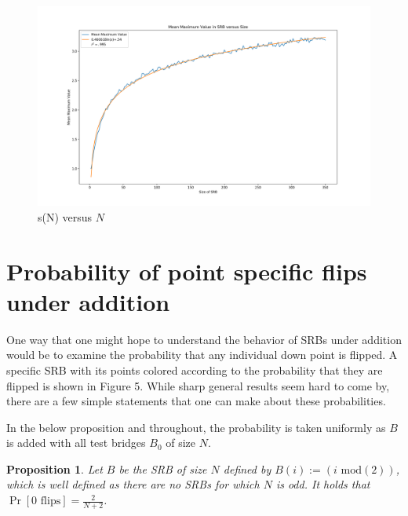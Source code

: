 \documentclass{article}
\newtheorem{proposition}{Proposition}
\theoremstyle{definition}
\begin{document}
\begin{figure}[h!]
\caption{s(N) versus $N$}
\centering
\includegraphics[width=\textwidth]{Figure_4}
\end{figure}


\section{Probability of point specific flips under addition}

One way that one might hope to understand the behavior of SRBs under addition would be to examine the probability that any individual down point is flipped. A specific SRB with its points colored according to the probability that they are flipped is shown in Figure 5. While sharp general results seem hard to come by, there are a few simple statements that one can make about these probabilities.

In the below proposition and throughout, the probability is taken uniformly as $B$ is added with all test bridges $B_0$ of size $N$.

\begin{proposition} Let $B$ be the SRB of size $N$ defined by $B(i):=(i\,\,\mathrm{mod}(2))$, which is well defined as there are no SRBs for which $N$ is odd. It holds that $\Pr[0\,\,\mathrm{flips}]=\frac{2}{N+2}$.
\end{proposition}
\end{document}

